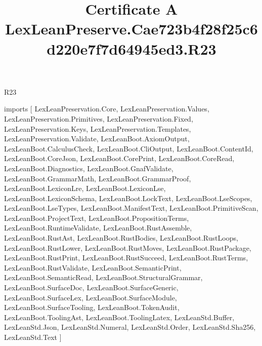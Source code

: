\begin{lexlean}{R23}
\title{Certificate A LexLeanPreserve.Cae723b4f28f25c6d220e7f7d64945ed3.R23}
\begin{coremodule}
imports [
  LexLeanPreservation.Core,
  LexLeanPreservation.Values,
  LexLeanPreservation.Primitives,
  LexLeanPreservation.Fixed,
  LexLeanPreservation.Keys,
  LexLeanPreservation.Templates,
  LexLeanPreservation.Validate,
  LexLeanBoot.AxiomOutput,
  LexLeanBoot.CalculusCheck,
  LexLeanBoot.CliOutput,
  LexLeanBoot.ContentId,
  LexLeanBoot.CoreJson,
  LexLeanBoot.CorePrint,
  LexLeanBoot.CoreRead,
  LexLeanBoot.Diagnostics,
  LexLeanBoot.GnafValidate,
  LexLeanBoot.GrammarMath,
  LexLeanBoot.GrammarProof,
  LexLeanBoot.LexiconLre,
  LexLeanBoot.LexiconLse,
  LexLeanBoot.LexiconSchema,
  LexLeanBoot.LockText,
  LexLeanBoot.LseScopes,
  LexLeanBoot.LseTypes,
  LexLeanBoot.ManifestText,
  LexLeanBoot.PrimitiveScan,
  LexLeanBoot.ProjectText,
  LexLeanBoot.PropositionTerms,
  LexLeanBoot.RuntimeValidate,
  LexLeanBoot.RustAssemble,
  LexLeanBoot.RustAst,
  LexLeanBoot.RustBodies,
  LexLeanBoot.RustLoops,
  LexLeanBoot.RustLower,
  LexLeanBoot.RustMoves,
  LexLeanBoot.RustPackage,
  LexLeanBoot.RustPrint,
  LexLeanBoot.RustSucceed,
  LexLeanBoot.RustTerms,
  LexLeanBoot.RustValidate,
  LexLeanBoot.SemanticPrint,
  LexLeanBoot.SemanticRead,
  LexLeanBoot.StructuralGrammar,
  LexLeanBoot.SurfaceDoc,
  LexLeanBoot.SurfaceGeneric,
  LexLeanBoot.SurfaceLex,
  LexLeanBoot.SurfaceModule,
  LexLeanBoot.SurfaceTooling,
  LexLeanBoot.TokenAudit,
  LexLeanBoot.ToolingAst,
  LexLeanBoot.ToolingLatex,
  LexLeanStd.Buffer,
  LexLeanStd.Json,
  LexLeanStd.Numeral,
  LexLeanStd.Order,
  LexLeanStd.Sha256,
  LexLeanStd.Text
]


\end{coremodule}
\end{lexlean}
